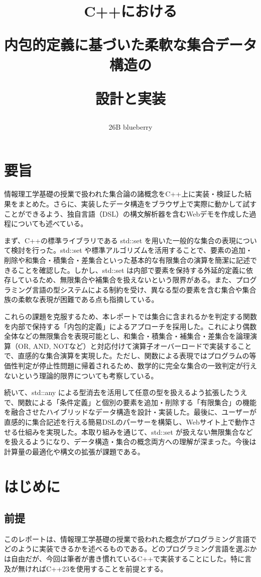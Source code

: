 \documentclass[a4paper,11pt]{ltjsarticle}
\title{C++における

内包的定義に基づいた柔軟な集合データ構造の

設計と実装}
\author{26B blueberry}
\date{}
\begin{document}
\maketitle

\tableofcontents
\newpage %

\section*{要旨}
情報理工学基礎の授業で扱われた集合論の諸概念をC++上に実装・検証した結果をまとめた。さらに、実装したデータ構造をブラウザ上で実際に動かして試すことができるよう、独自言語（DSL）の構文解析器を含むWebデモを作成した過程についても述べている。

まず、C++の標準ライブラリである std::set を用いた一般的な集合の表現について検討を行った。std::set や標準アルゴリズムを活用することで、要素の追加・削除や和集合・積集合・差集合といった基本的な有限集合の演算を簡潔に記述できることを確認した。しかし、std::set は内部で要素を保持する外延的定義に依存しているため、無限集合や補集合を扱えないという限界がある。また、プログラミング言語の型システムによる制約を受け、異なる型の要素を含む集合や集合族の柔軟な表現が困難である点も指摘している。

これらの課題を克服するため、本レポートでは集合に含まれるかを判定する関数を内部で保持する「内包的定義」によるアプローチを採用した。これにより偶数全体などの無限集合を表現可能とし、和集合・積集合・補集合・差集合を論理演算（OR, AND, NOTなど）と対応付けて演算子オーバーロードで実装することで、直感的な集合演算を実現した。ただし、関数による表現ではプログラムの等価性判定が停止性問題に帰着されるため、数学的に完全な集合の一致判定が行えないという理論的限界についても考察している。 

続いて、std::any による型消去を活用して任意の型を扱えるよう拡張したうえで、関数による「条件定義」と個別の要素を追加・削除する「有限集合」の機能を融合させたハイブリッドなデータ構造を設計・実装した。最後に、ユーザーが直感的に集合記述を行える簡易DSLのパーサーを構築し、Webサイト上で動作させる仕組みを実現した。本取り組みを通じて、std::set が扱えない無限集合などを扱えるようになり、データ構造・集合の概念両方への理解が深まった。今後は計算量の最適化や構文の拡張が課題である。
\newpage

\section{はじめに}
\subsection{前提}
このレポートは、情報理工学基礎の授業で扱われた概念がプログラミング言語でどのように実装できるかを述べるものである。どのプログラミング言語を選ぶかは自由だが、今回は筆者が書き慣れているC++で実装することにした。特に言及が無ければC++23を使用することを前提とする。
\end{document}
